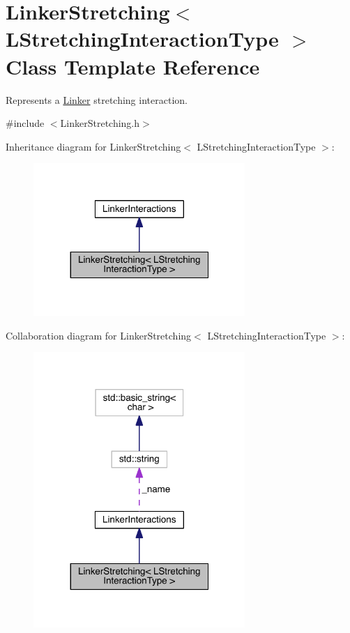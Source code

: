 \hypertarget{classLinkerStretching}{\section{Linker\+Stretching$<$ L\+Stretching\+Interaction\+Type $>$ Class Template Reference}
\label{classLinkerStretching}
}


Represents a \hyperlink{classLinker}{Linker} stretching interaction.  




{\ttfamily \#include $<$Linker\+Stretching.\+h$>$}



Inheritance diagram for Linker\+Stretching$<$ L\+Stretching\+Interaction\+Type $>$\+:
\nopagebreak
\begin{figure}[H]
\begin{center}
\leavevmode
\includegraphics[width=227pt]{classLinkerStretching__inherit__graph}
\end{center}
\end{figure}


Collaboration diagram for Linker\+Stretching$<$ L\+Stretching\+Interaction\+Type $>$\+:
\nopagebreak
\begin{figure}[H]
\begin{center}
\leavevmode
\includegraphics[width=227pt]{classLinkerStretching__coll__graph}
\end{center}
\end{figure}
